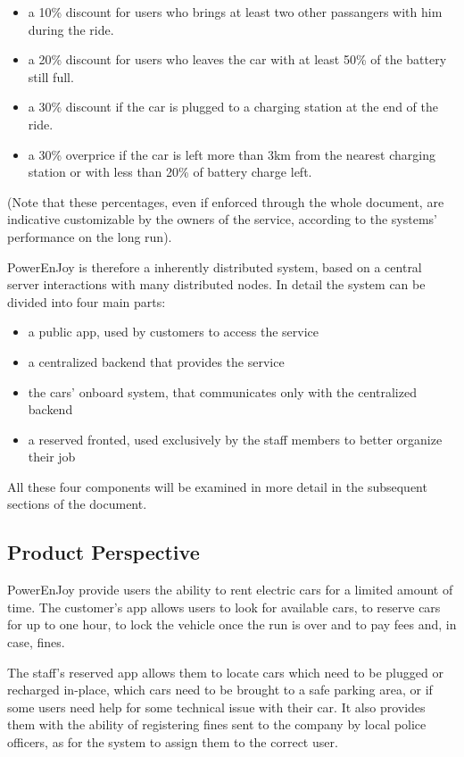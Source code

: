 \documentclass[11pt]{article} %
\newcommand{\pe}{PowerEnJoy }
\begin{document}
\begin{itemize}[noitemsep]
	\item a 10\% discount for users who brings at least two other
 passangers with him during the ride.
	\item a 20\% discount for users who leaves the car with at least 50\% of the battery still full.
	\item a 30\% discount if the car is plugged to a charging station at the end of the ride.
	\item a 30\% overprice if the car is left more than 3km from the nearest charging station or with less than 20\% of battery charge left.
\end{itemize}
(Note that these percentages, even if enforced through the whole document, are indicative customizable by the owners of the service, according to the systems' performance on the long run).

\pe is therefore a inherently distributed system, based on a central server interactions with many distributed nodes. In detail the system can be divided into four main parts: 

\begin{itemize}[noitemsep]
	\item a public app, used by customers to access the service
	\item a centralized backend that provides the service
	\item the cars' onboard system, that communicates only with the centralized backend
	\item a reserved fronted, used exclusively by the staff members to better organize their job
\end{itemize}
All these four components will be examined in more detail in the subsequent sections of the document.


\subsection{Product Perspective}
  
  \pe provide users the ability to rent electric cars for a limited amount of time. The customer's app allows users to look for available cars, to reserve cars for up to one hour, to lock the vehicle once the run is over and to pay fees and, in case, fines.

The staff's reserved app allows them to locate cars which need to be plugged or recharged in-place, which cars need to be brought to a safe parking area, or if some users need help for some technical issue with their car. It also provides them with the ability of registering fines sent to the company by local police officers, as for the system to assign them to the correct user.
\end{document}
